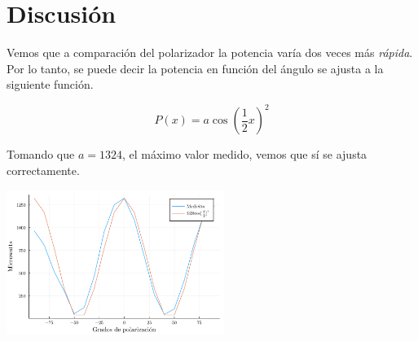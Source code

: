\documentclass[twocolumn]{article}
\begin{document}
	\section{Discusión}
		Vemos que a comparación del polarizador la potencia varía dos veces más \emph{rápida}. Por lo tanto, se puede decir la potencia en función del ángulo se ajusta a la siguiente función.

		$$
		P(x) = a \cos(\frac{1}{2}x)^2
		$$

		Tomando que $a=1324$, el máximo valor medido, vemos que sí se ajusta correctamente.

		\begin{center}
			\includegraphics[width=200pt]{img/comparison.pdf}
		\end{center}
\end{document}
